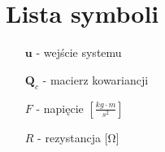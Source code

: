 \chapter*{Lista symboli}

\begin{itemize}[noitemsep,topsep=0pt,parsep=0pt,partopsep=0pt,labelwidth=1cm,align=left,itemindent=0pt]
\item[$\mathbf{u}$] - wejście systemu
\item[$\mathbf{Q}_c$] - macierz kowariancji
\item[$F$] - napięcie $\left[ \frac{kg \cdot m}{s^2} \right]$ %
\item[$R$] - rezystancja [\si{\ohm}]
\end{itemize}